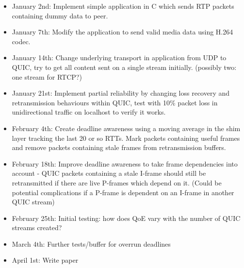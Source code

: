 \documentclass{mprop}
\begin{document}
\begin{itemize}
  \item January 2nd: Implement simple application in C which sends RTP packets containing dummy 
  data to peer.
  \item January 7th: Modify the application to send valid media data using H.264 codec.
  \item January 14th: Change underlying transport in application from UDP to QUIC, try to get all 
  content sent on a single stream initially. (possibly two: one stream for RTCP?)
  \item January 21st: Implement partial reliability by changing loss recovery and retransmission 
  behaviours within QUIC, test with 10\% packet loss in unidirectional traffic on localhost to 
  verify it works.
  \item February 4th: Create deadline awareness using a moving average in the shim layer tracking 
  the last 20 or so RTTs. Mark packets containing useful frames and remove packets containing 
  stale frames from retransmission buffers.
  \item February 18th: Improve deadline awareness to take frame dependencies into account - QUIC 
  packets containing a stale I-frame should still be retransmitted if there are live P-frames 
  which depend on it. (Could be potential complications if a P-frame is dependent on an I-frame 
  in another QUIC stream)
  \item February 25th: Initial testing: how does QoE vary with the number of QUIC streams created?
  \item March 4th: Further tests/buffer for overrun deadlines
  \item April 1st: Write paper
\end{itemize}

\newpage



\end{document}

